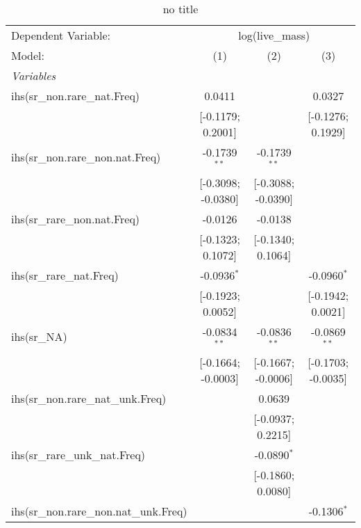 
\begin{table}[htbp]
   \caption{no title}
   \centering
   \begin{tabular}{lccc}
      \tabularnewline \midrule \midrule
      Dependent Variable: & \multicolumn{3}{c}{log(live\_mass)}\\
      Model:                                  & (1)                & (2)                & (3)\\  
      \midrule
      \emph{Variables}\\
      ihs(sr\_non.rare\_nat.Freq)             & 0.0411             &                    & 0.0327\\   
                                              & [-0.1179; 0.2001]  &                    & [-0.1276; 0.1929]\\   
      ihs(sr\_non.rare\_non.nat.Freq)         & -0.1739$^{**}$     & -0.1739$^{**}$     &   \\   
                                              & [-0.3098; -0.0380] & [-0.3088; -0.0390] &   \\   
      ihs(sr\_rare\_non.nat.Freq)             & -0.0126            & -0.0138            &   \\   
                                              & [-0.1323; 0.1072]  & [-0.1340; 0.1064]  &   \\   
      ihs(sr\_rare\_nat.Freq)                 & -0.0936$^{*}$      &                    & -0.0960$^{*}$\\   
                                              & [-0.1923; 0.0052]  &                    & [-0.1942; 0.0021]\\   
      ihs(sr\_NA)                             & -0.0834$^{**}$     & -0.0836$^{**}$     & -0.0869$^{**}$\\   
                                              & [-0.1664; -0.0003] & [-0.1667; -0.0006] & [-0.1703; -0.0035]\\   
      ihs(sr\_non.rare\_nat\_unk.Freq)        &                    & 0.0639             &   \\   
                                              &                    & [-0.0937; 0.2215]  &   \\   
      ihs(sr\_rare\_unk\_nat.Freq)            &                    & -0.0890$^{*}$      &   \\   
                                              &                    & [-0.1860; 0.0080]  &   \\   
      ihs(sr\_non.rare\_non.nat\_unk.Freq)    &                    &                    & -0.1306$^{*}$\\   

\end{tabular}
\end{table}
